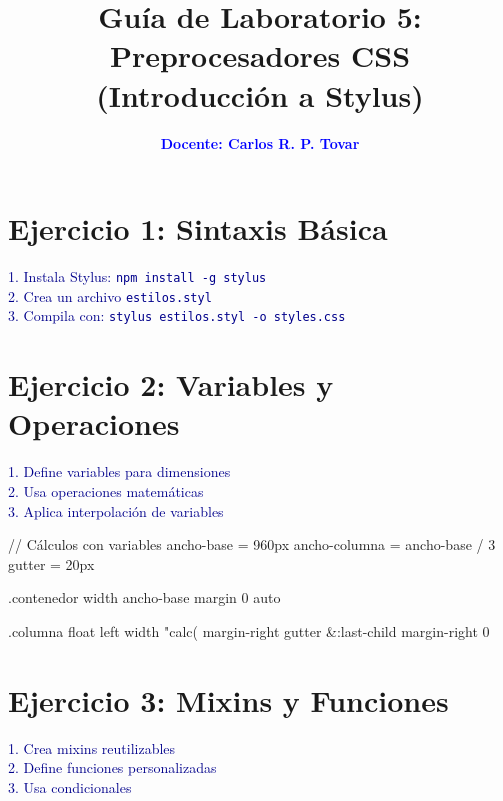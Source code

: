 \documentclass[12pt, a4paper]{article}
\title{\textbf{Guía de Laboratorio 5: Preprocesadores CSS \\ (Introducción a Stylus)}}
\author{\textcolor{blue}{\textbf{Docente: Carlos R. P. Tovar}}}
\date{}
\newcommand{\enunciado}[1]{
    \vspace{0.5em}
    \noindent\colorbox{blue!10}{
        \parbox{\dimexpr\textwidth-2\fboxsep}{
            \small\sffamily\textcolor{darkblue}{#1}
        }
    }
    \vspace{0.5em}
}
\begin{document}
\maketitle
\thispagestyle{empty}

\section*{Ejercicio 1: Sintaxis Básica}
\enunciado{
    1. Instala Stylus: \texttt{npm install -g stylus} \\
    2. Crea un archivo \texttt{estilos.styl} \\
    3. Compila con: \texttt{stylus estilos.styl -o styles.css}
}


\section*{Ejercicio 2: Variables y Operaciones}
\enunciado{
    1. Define variables para dimensiones \\
    2. Usa operaciones matemáticas \\
    3. Aplica interpolación de variables
}

\begin{codebox}[title=Stylus]
// Cálculos con variables
ancho-base = 960px
ancho-columna = ancho-base / 3
gutter = 20px

.contenedor
    width ancho-base
    margin 0 auto

.columna
    float left
    width "calc(%
    margin-right gutter
    &:last-child
        margin-right 0
\end{codebox}

\section*{Ejercicio 3: Mixins y Funciones}
\enunciado{
    1. Crea mixins reutilizables \\
    2. Define funciones personalizadas \\
    3. Usa condicionales
}
\end{document}
